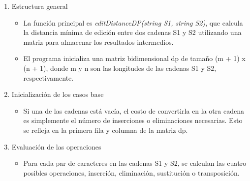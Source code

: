 \begin{enumerate}
    \item Estructura general
    \begin{itemize}
        \item La función principal es \textit{editDistanceDP(string S1, string S2)}, que calcula la distancia mínima de edición entre dos cadenas S1 y S2 utilizando una matriz para almacenar los resultados intermedios.

        \item El programa inicializa una matriz bidimensional dp de tamaño (m + 1) x (n + 1), donde m y n son las longitudes de las cadenas S1 y S2, respectivamente.
    \end{itemize}

    \item Inicialización de los casos base
    \begin{itemize}
        \item Si una de las cadenas está vacía, el costo de convertirla en la otra cadena es simplemente el número de inserciones o eliminaciones necesarias. Esto se refleja en la primera fila y columna de la matriz dp.
    \end{itemize}

    \item Evaluación de las operaciones
    \begin{itemize}
        \item Para cada par de caracteres en las cadenas S1 y S2, se calculan las cuatro posibles operaciones, inserción, eliminación, sustitución o transposición.
    \end{itemize}
\end{enumerate}